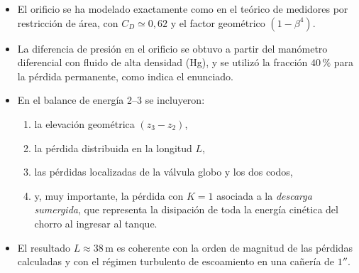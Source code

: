 \documentclass[12pt, a4paper]{article}
\begin{document}
\begin{itemize}
  \item El orificio se ha modelado exactamente como en el teórico de medidores
        por restricción de área, con $C_D\simeq 0{,}62$ y el factor geométrico
        $(1-\beta^4)$.
  \item La diferencia de presión en el orificio se obtuvo a partir del manómetro
        diferencial con fluido de alta densidad (Hg), y se utilizó la fracción
        $40\,\%$ para la pérdida permanente, como indica el enunciado.
  \item En el balance de energía 2--3 se incluyeron:
        \begin{enumerate}
          \item la elevación geométrica $(z_3-z_2)$,
          \item la pérdida distribuida en la longitud $L$,
          \item las pérdidas localizadas de la válvula globo y los dos codos,
          \item y, muy importante, la pérdida con $K=1$ asociada a la 
                \emph{descarga sumergida}, que representa la disipación de
                toda la energía cinética del chorro al ingresar al tanque.
        \end{enumerate}
  \item El resultado $L \approx 38\,\text{m}$ es coherente con la orden de 
        magnitud de las pérdidas calculadas y con el régimen turbulento de 
        escoamiento en una cañería de $1''$.
\end{itemize}
\end{document}
